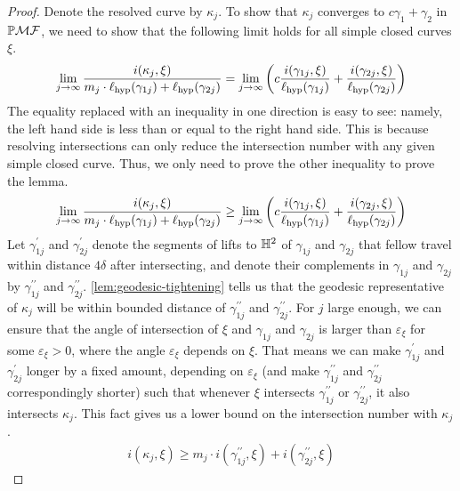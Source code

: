 \documentclass[12pt, reqno]{amsart}
\begin{document}
\begin{proof}
  Denote the resolved curve by $\kappa_j$.
  To show that $\kappa_j$ converges to $c \gamma_1 + \gamma_2$ in $\mathbb{P}\mathcal{MF}$, we need to show that the following limit holds for all simple closed curves $\xi$.
  \begin{align}
    \label{eq:2}
    \lim_{j \to \infty} \frac{i(\kappa_j, \xi)}{m_j \cdot \ell_{\mathrm{hyp}}(\gamma_{1j}) + \ell_{\mathrm{hyp}}(\gamma_{2j})}
    = \lim_{j \to \infty} \left( c \frac{i(\gamma_{1j}, \xi)}{\ell_{\mathrm{hyp}}(\gamma_{1j})} +  \frac{i(\gamma_{2j}, \xi)}{\ell_{\mathrm{hyp}}(\gamma_{2j})} \right)
  \end{align}
  The equality replaced with an inequality in one direction is easy to see: namely, the left hand side is less than or equal to the right hand side.
  This is because resolving intersections can only reduce the intersection number with any given simple closed curve.
  Thus, we only need to prove the other inequality to prove the lemma.
  \begin{align}
    \label{eq:3}
    \lim_{j \to \infty} \frac{i(\kappa_j, \xi)}{m_j \cdot \ell_{\mathrm{hyp}}(\gamma_{1j}) + \ell_{\mathrm{hyp}}(\gamma_{2j})}
    \geq \lim_{j \to \infty} \left( c \frac{i(\gamma_{1j}, \xi)}{\ell_{\mathrm{hyp}}(\gamma_{1j})} +  \frac{i(\gamma_{2j}, \xi)}{\ell_{\mathrm{hyp}}(\gamma_{2j})} \right)
  \end{align}
  Let $\gamma_{1j}^{\prime}$ and $\gamma_{2j}^{\prime}$ denote the segments of lifts to $\mathbb{H}^2$ of $\gamma_{1j}$ and $\gamma_{2j}$ that fellow travel within distance $4\delta$ after intersecting, and denote their complements in $\gamma_{1j}$ and $\gamma_{2j}$ by $\gamma_{1j}^{\prime \prime}$ and $\gamma_{2j}^{\prime \prime}$.
  \autoref{lem:geodesic-tightening} tells us that the geodesic representative of $\kappa_j$ will be within bounded distance of $\gamma_{1j}^{\prime \prime}$ and $\gamma_{2j}^{\prime \prime}$.
  For $j$ large enough, we can ensure that the angle of intersection of $\xi$ and $\gamma_{1j}$ and $\gamma_{2j}$ is larger than $\varepsilon_\xi$ for some $\varepsilon_\xi > 0$, where the angle $\varepsilon_\xi$ depends on $\xi$.
  That means we can make $\gamma_{1j}^{\prime}$ and $\gamma_{2j}^{\prime}$ longer by a fixed amount, depending on $\varepsilon_\xi$ (and make $\gamma_{1j}^{\prime \prime}$ and $\gamma_{2j}^{\prime \prime}$ correspondingly shorter) such that whenever $\xi$ intersects $\gamma_{1j}^{\prime \prime}$ or $\gamma_{2j}^{\prime \prime}$, it also intersects $\kappa_j$.
  This fact gives us a lower bound on the intersection number with $\kappa_j$.
  \begin{align}
    \label{eq:4}
    i(\kappa_j, \xi) \geq m_j \cdot i(\gamma_{1j}^{\prime \prime}, \xi) + i(\gamma_{2j}^{\prime \prime}, \xi)

\end{align}
\end{proof}
\end{document}
